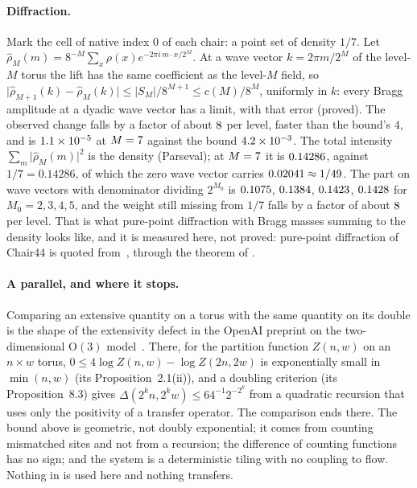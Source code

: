 \documentclass[11pt,a4paper]{article}
\theoremstyle{plain}
\theoremstyle{definition}
\begin{document}
\paragraph{Diffraction.} Mark the cell of native index $0$ of each chair: a point set of density $1/7$. Let
$\hat\rho_M(m)=8^{-M}\sum_x\rho(x)e^{-2\pi i\,m\cdot x/2^M}$. At a wave vector $k=2\pi m/2^M$ of the level-$M$ torus the lift has the same coefficient
as the level-$M$ field, so $\lvert\hat\rho_{M+1}(k)-\hat\rho_M(k)\rvert\le\lvert S_M\rvert/8^{M+1}\le c(M)/8^M$, uniformly in $k$: every Bragg amplitude at a dyadic
wave vector has a limit, with that error (proved). The observed change falls by a factor of about $8$ per level, faster than the
bound's $4$, and is $1.1\times10^{-5}$ at $M=7{}$ against the bound $4.2\times10^{-3}$. The total intensity $\sum_m\lvert\hat\rho_M(m)\rvert^2$ is the density (Parseval); at $M=7{}$ it is
$0.14286$, against $1/7=0.14286$, of which the zero wave vector carries $0.02041\approx1/49$. The part on wave vectors with denominator dividing $2^{M_0}$ is
$0.1075$, $0.1384$, $0.1423$, $0.1428$ for $M_0=2,3,4,5$, and the weight still missing from $1/7$ falls by a factor of about $8$ per level.
That is what pure-point diffraction with Bragg masses summing to the density looks like, and it is measured here, not proved: pure-point diffraction of
Chair44 is quoted from~\cite{HartshornRomanov}, through the theorem of \cite{LeeMoody,Schlottmann,LMS}.

\paragraph{A parallel, and where it stops.} Comparing an extensive quantity on a torus with the same quantity on its double is the
shape of the extensivity defect in the OpenAI preprint on the two-dimensional $\mathrm{O}(3)$ model~\cite{OAIO3}. There, for the
partition function $Z(n,w)$ on an $n\times w$ torus, $0\le4\log Z(n,w)-\log Z(2n,2w)$ is exponentially small in $\min(n,w)$
(its Proposition~2.1(ii)), and a doubling criterion (its Proposition~8.3) gives $\Delta(2^kn,2^kw)\le64^{-1}2^{-2^k}$ from a quadratic
recursion that uses only the positivity of a transfer operator. The comparison ends there. The bound above is geometric, not doubly exponential;
it comes from counting mismatched sites and not from a recursion; the difference of counting functions has no sign; and the system is a deterministic
tiling with no coupling to flow. Nothing in \cite{OAIO3} is used here and nothing transfers.
\end{document}

